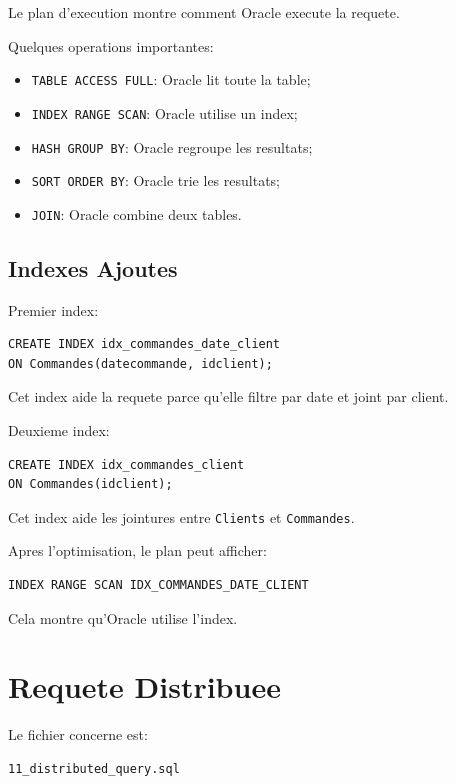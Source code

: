 \documentclass[12pt,a4paper]{report}
\begin{document}
Le plan d'execution montre comment Oracle execute la requete.

Quelques operations importantes:

\begin{itemize}
    \item \texttt{TABLE ACCESS FULL}: Oracle lit toute la table;
    \item \texttt{INDEX RANGE SCAN}: Oracle utilise un index;
    \item \texttt{HASH GROUP BY}: Oracle regroupe les resultats;
    \item \texttt{SORT ORDER BY}: Oracle trie les resultats;
    \item \texttt{JOIN}: Oracle combine deux tables.
\end{itemize}

\section{Indexes Ajoutes}

Premier index:

\begin{lstlisting}[style=sqlstyle]
CREATE INDEX idx_commandes_date_client
ON Commandes(datecommande, idclient);
\end{lstlisting}

Cet index aide la requete parce qu'elle filtre par date et joint par client.

Deuxieme index:

\begin{lstlisting}[style=sqlstyle]
CREATE INDEX idx_commandes_client
ON Commandes(idclient);
\end{lstlisting}

Cet index aide les jointures entre \texttt{Clients} et \texttt{Commandes}.

Apres l'optimisation, le plan peut afficher:

\begin{lstlisting}[style=textstyle]
INDEX RANGE SCAN IDX_COMMANDES_DATE_CLIENT
\end{lstlisting}

Cela montre qu'Oracle utilise l'index.

\chapter{Requete Distribuee}

Le fichier concerne est:

\begin{lstlisting}[style=textstyle]
11_distributed_query.sql
\end{lstlisting}
\end{document}
